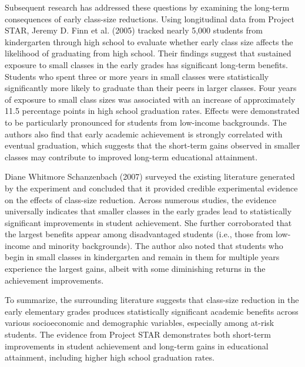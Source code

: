 \documentclass[11pt]{article}
\begin{document}
Subsequent research has addressed these questions by examining the long-term consequences of early class-size reductions. Using longitudinal data from Project STAR, Jeremy D. Finn et al. (2005) \cite{finn2005_small_classes_graduation} tracked nearly 5,000 students from kindergarten through high school to evaluate whether early class size affects the likelihood of graduating from high school. Their findings suggest that sustained exposure to small classes in the early grades has significant long-term benefits. Students who spent three or more years in small classes were statistically significantly more likely to graduate than their peers in larger classes. Four years of exposure to small class sizes was associated with an increase of approximately 11.5 percentage points in high school graduation rates. Effects were demonstrated to be particularly pronounced for students from low-income backgrounds. The authors also find that early academic achievement is strongly correlated with eventual graduation, which suggests that the short-term gains observed in smaller classes may contribute to improved long-term educational attainment.

Diane Whitmore Schanzenbach (2007) \cite{schanzenbach2007_project_star} surveyed the existing literature generated by the experiment and concluded that it provided credible experimental evidence on the effects of class-size reduction. Across numerous studies, the evidence universally indicates that smaller classes in the early grades lead to statistically significant improvements in student achievement. She further corroborated that the largest benefits appear among disadvantaged students (i.e., those from low-income and minority backgrounds). The author also noted that students who begin in small classes in kindergarten and remain in them for multiple years experience the largest gains, albeit with some diminishing returns in the achievement improvements.

To summarize, the surrounding literature suggests that class-size reduction in the early elementary grades produces statistically significant academic benefits across various socioeconomic and demographic variables, especially among at-risk students. The evidence from Project STAR demonstrates both short-term improvements in student achievement and long-term gains in educational attainment, including higher high school graduation rates. 


\end{document}
